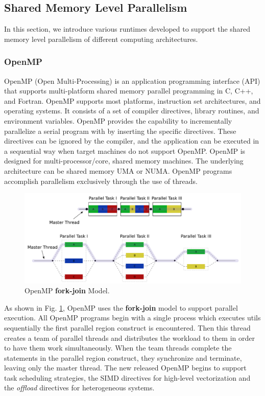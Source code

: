 \subsection{Shared Memory Level Parallelism}

In this section, we introduce various runtimes developed to support the shared memory level parallelism of different computing architectures. 

\subsubsection{OpenMP}

OpenMP (Open Multi-Processing) \cite{dagum1998openmp} is an application programming interface (API) that supports multi-platform shared memory parallel programming in C, C++, and Fortran. OpenMP supports most platforms, instruction set architectures, and operating systems. It consists of a set of compiler directives, library routines, and environment variables. OpenMP provides the capability to incrementally parallelize a serial program with by inserting the specific directives. These directives can be ignored by the compiler, and the application can be executed in a sequential way when target machines do not support OpenMP. OpenMP is designed for multi-processor/core, shared memory machines. The underlying architecture can be shared memory UMA or NUMA. OpenMP programs accomplish parallelism exclusively through the use of threads.

\begin{figure}[htbp]
	\centering
	\includegraphics[width=6.3in]{fig/Fork_join.pdf}
	\caption{OpenMP \textbf{fork-join} Model.}
	\label{openmp_fork_join}
\end{figure}

As shown in Fig. \ref{openmp_fork_join}, OpenMP uses the \textbf{fork-join} model to support parallel execution. All OpenMP programs begin with a single process which executes utils sequentially the first parallel region construct is encountered.  Then this thread creates a team of parallel threads and distributes the workload to them in order to have them work simultaneously. When the team threads complete the statements in the parallel region construct, they synchronize and terminate, leaving only the master thread. The new released OpenMP begins to support task scheduling strategies, the SIMD directives for high-level vectorization and the \textit{offload} directives for heterogeneous systems.

